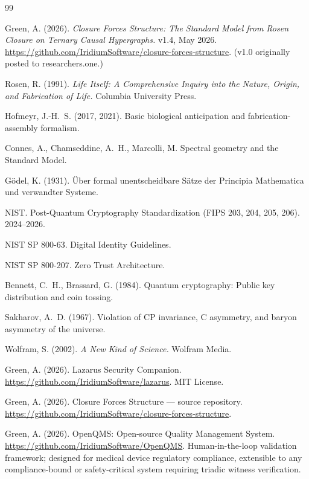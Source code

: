 \documentclass[11pt,a4paper]{article}
\theoremstyle{definition}
\theoremstyle{remark}
\begin{document}
\begin{thebibliography}{99}

Green, A. (2026).
\textit{Closure Forces Structure: The Standard Model from Rosen Closure on Ternary Causal Hypergraphs.} v1.4, May 2026.
\url{https://github.com/IridiumSoftware/closure-forces-structure}.
(v1.0 originally posted to researchers.one.)

Rosen, R. (1991).
\textit{Life Itself: A Comprehensive Inquiry into the Nature, Origin, and Fabrication of Life.}
Columbia University Press.

Hofmeyr, J.-H.~S. (2017, 2021).
Basic biological anticipation and fabrication-assembly formalism.

Connes, A., Chamseddine, A.~H., Marcolli, M.
Spectral geometry and the Standard Model.

G\"odel, K. (1931).
\"Uber formal unentscheidbare S\"atze der Principia Mathematica und verwandter Systeme.

NIST. Post-Quantum Cryptography Standardization (FIPS 203, 204, 205, 206). 2024--2026.

NIST SP 800-63. Digital Identity Guidelines.

NIST SP 800-207. Zero Trust Architecture.

Bennett, C.~H., Brassard, G. (1984).
Quantum cryptography: Public key distribution and coin tossing.

Sakharov, A.~D. (1967).
Violation of CP invariance, C asymmetry, and baryon asymmetry of the universe.

Wolfram, S. (2002).
\textit{A New Kind of Science.}
Wolfram Media.

Green, A. (2026).
Lazarus Security Companion.
\url{https://github.com/IridiumSoftware/lazarus}. MIT License.

Green, A. (2026).
Closure Forces Structure --- source repository.
\url{https://github.com/IridiumSoftware/closure-forces-structure}.

Green, A. (2026).
OpenQMS: Open-source Quality Management System.
\url{https://github.com/IridiumSoftware/OpenQMS}.
Human-in-the-loop validation framework; designed for medical device regulatory compliance, extensible to any compliance-bound or safety-critical system requiring triadic witness verification.


\end{thebibliography}
\end{document}
